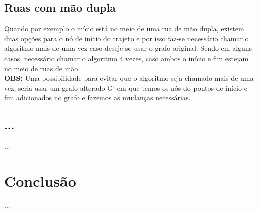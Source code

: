 \documentclass{article}
\begin{document}
\subsection{Ruas com mão dupla}
Quando por exemplo o início está no meio de uma rua de mão dupla, existem duas opções para o nó de início do trajeto e por isso faz-se necessário chamar o algoritmo mais de uma vez caso deseje-se usar o grafo original. Sendo em alguns casos, necessário chamar o algoritmo 4 vezes, caso ambos o início e fim estejam no meio de ruas de mão.\\
\textbf{OBS:} Uma possibilidade para evitar que o algoritmo seja chamado mais de uma vez, seria usar um grafo alterado G' em que temos os nós do pontos de início e fim adicionados no grafo e fazemos as mudanças necessárias.

\subsection{...}
...

\section{Conclusão}
...
\end{document}

